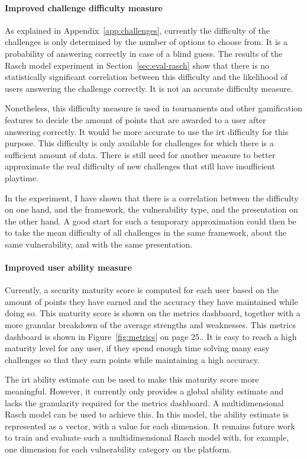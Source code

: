 \paragraph{Improved challenge difficulty measure}
As explained in Appendix~\ref{app:challenges}, currently the difficulty of the challenges is only determined by the number of options to choose from.
It is a probability of answering correctly in case of a blind guess.
The results of the Rasch model experiment in Section~\ref{sec:eval-rasch} show that there is no statistically significant correlation between this difficulty and the likelihood of users answering the challenge correctly.
It is not an accurate difficulty measure.

Nonetheless, this difficulty measure is used in tournaments and other gamification features to decide the amount of points that are awarded to a user after answering correctly.
It would be more accurate to use the \gls{irt} difficulty for this purpose.
This difficulty is only available for challenges for which there is a sufficient amount of data.
There is still need for another measure to better approximate the real difficulty of new challenges that still have insufficient playtime.

In the experiment, I have shown that there is a correlation between the difficulty on one hand, and the framework, the vulnerability type, and the presentation on the other hand.
A good start for such a temporary approximation could then be to take the mean difficulty of all challenges in the same framework, about the same vulnerability, and with the same presentation.

\paragraph{Improved user ability measure}
Currently, a security maturity score is computed for each user based on the amount of points they have earned and the accuracy they have maintained while doing so.
This maturity score is shown on the metrics dashboard, together with a more granular breakdown of the average strengths and weaknesses.
This metrics dashboard is shown in Figure~\ref{fig:metrics} on page 25..
It is easy to reach a high maturity level for any user, if they spend enough time solving many easy challenges so that they earn points while maintaining a high accuracy.

The \gls{irt} ability estimate can be used to make this maturity score more meaningful.
However, it currently only provides a global ability estimate and lacks the granularity required for the metrics dashboard.
A multidimensional Rasch model can be used to achieve this.
In this model, the ability estimate is represented as a vector, with a value for each dimension.
It remains future work to train and evaluate such a multidimensional Rasch model with, for example, one dimension for each vulnerability category on the platform.

